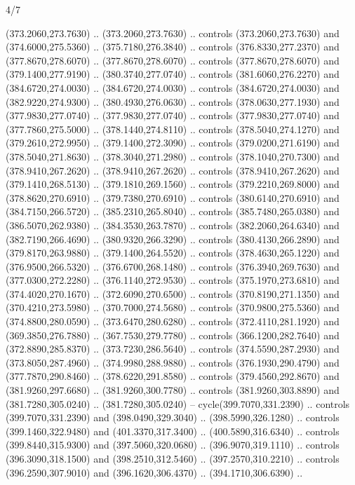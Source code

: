 \begin{flagdescription}{4/7}
\begin{scope}[shift={(0.5\flaglength,0.5\flagwidth)},scale=\flagwidth*\stretchfactor/820]
\begin{scope}[scale=1.87,xshift=-138mm,yshift=75mm]
\begin{scope}[y=0.8pt, x=0.8pt, yscale=-1, xscale=1]
\begin{scope}[fill=c9ca168]
  (373.2060,273.7630) .. (373.2060,273.7630) .. controls (373.2060,273.7630) and
  (374.6000,275.5360) .. (375.7180,276.3840) .. controls (376.8330,277.2370) and
  (377.8670,278.6070) .. (377.8670,278.6070) .. controls (377.8670,278.6070) and
  (379.1400,277.9190) .. (380.3740,277.0740) .. controls (381.6060,276.2270) and
  (384.6720,274.0030) .. (384.6720,274.0030) .. controls (384.6720,274.0030) and
  (382.9220,274.9300) .. (380.4930,276.0630) .. controls (378.0630,277.1930) and
  (377.9830,277.0740) .. (377.9830,277.0740) .. controls (377.9830,277.0740) and
  (377.7860,275.5000) .. (378.1440,274.8110) .. controls (378.5040,274.1270) and
  (379.2610,272.9950) .. (379.1400,272.3090) .. controls (379.0200,271.6190) and
  (378.5040,271.8630) .. (378.3040,271.2980) .. controls (378.1040,270.7300) and
  (378.9410,267.2620) .. (378.9410,267.2620) .. controls (378.9410,267.2620) and
  (379.1410,268.5130) .. (379.1810,269.1560) .. controls (379.2210,269.8000) and
  (378.8620,270.6910) .. (379.7380,270.6910) .. controls (380.6140,270.6910) and
  (384.7150,266.5720) .. (385.2310,265.8040) .. controls (385.7480,265.0380) and
  (386.5070,262.9380) .. (384.3530,263.7870) .. controls (382.2060,264.6340) and
  (382.7190,266.4690) .. (380.9320,266.3290) .. controls (380.4130,266.2890) and
  (379.8170,263.9880) .. (379.1400,264.5520) .. controls (378.4630,265.1220) and
  (376.9500,266.5320) .. (376.6700,268.1480) .. controls (376.3940,269.7630) and
  (377.0300,272.2280) .. (376.1140,272.9530) .. controls (375.1970,273.6810) and
  (374.4020,270.1670) .. (372.6090,270.6500) .. controls (370.8190,271.1350) and
  (370.4210,273.5980) .. (370.7000,274.5680) .. controls (370.9800,275.5360) and
  (374.8800,280.0590) .. (373.6470,280.6280) .. controls (372.4110,281.1920) and
  (369.3850,276.7880) .. (367.7530,279.7780) .. controls (366.1200,282.7640) and
  (372.8890,285.8370) .. (373.7230,286.5640) .. controls (374.5590,287.2930) and
  (373.8050,287.4960) .. (374.9980,288.9880) .. controls (376.1930,290.4790) and
  (377.7870,290.8460) .. (378.6220,291.8580) .. controls (379.4560,292.8670) and
  (381.9260,297.6680) .. (381.9260,300.7780) .. controls (381.9260,303.8890) and
  (381.7280,305.0240) .. (381.7280,305.0240) -- cycle(399.7070,331.2390) ..
  controls (399.7070,331.2390) and (398.0490,329.3040) .. (398.5990,326.1280) ..
  controls (399.1460,322.9480) and (401.3370,317.3400) .. (400.5890,316.6340) ..
  controls (399.8440,315.9300) and (397.5060,320.0680) .. (396.9070,319.1110) ..
  controls (396.3090,318.1500) and (398.2510,312.5460) .. (397.2570,310.2210) ..
  controls (396.2590,307.9010) and (396.1620,306.4370) .. (394.1710,306.6390) ..

\end{scope}
\end{scope}
\end{scope}
\end{scope}
\end{flagdescription}
